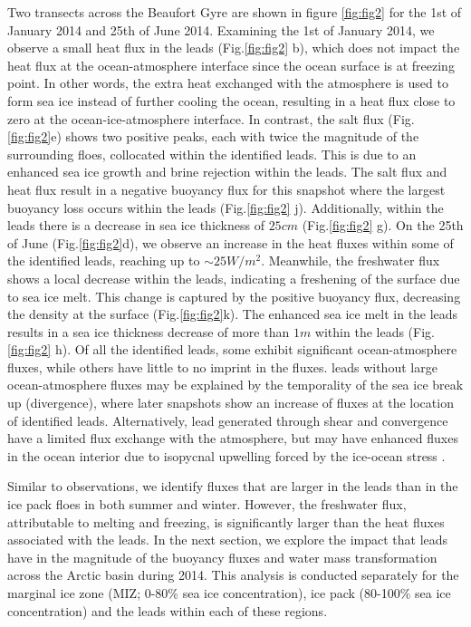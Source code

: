 \documentclass[draft]{agujournal2019}
\begin{document}
Two transects across the Beaufort Gyre are shown in figure \ref{fig:fig2} for the 1st of January 2014 and 25th of June 2014.
Examining the 1st of January 2014, we observe a small heat flux in the leads (Fig.\ref{fig:fig2} b), which does not impact the heat flux at the ocean-atmosphere interface since the ocean surface is at freezing point. 
In other words, the extra heat exchanged with the atmosphere is used to form sea ice instead of further cooling the ocean, resulting in a heat flux close to zero at the ocean-ice-atmosphere interface.
In contrast, the salt flux (Fig.\ref{fig:fig2}e) shows two positive peaks, each with twice the magnitude of the surrounding floes, collocated within the identified leads. This is due to an enhanced sea ice growth and brine rejection within the leads. 
The salt flux and heat flux result in a negative buoyancy flux for this snapshot where the largest buoyancy loss occurs within the leads (Fig.\ref{fig:fig2} j). Additionally, within the leads there is a decrease in sea ice thickness of $25cm$ (Fig.\ref{fig:fig2} g). 
On the 25th of June (Fig.\ref{fig:fig2}d), we observe an increase in the heat fluxes within some of the identified leads, reaching up to $\sim 25 W/m^2$. Meanwhile, the freshwater flux shows a local decrease within the leads, indicating a freshening of the surface due to sea ice melt. This change is captured by the positive buoyancy flux, decreasing the density at the surface (Fig.\ref{fig:fig2}k).  The enhanced sea ice melt in the leads results in a sea ice thickness decrease of more than $1m$ within the leads  (Fig.\ref{fig:fig2} h).
Of all the identified leads, some exhibit significant ocean-atmosphere fluxes, while others have little to no imprint in the fluxes. leads without large ocean-atmosphere fluxes may be explained by the temporality of the sea ice break up (divergence), where later snapshots show an increase of fluxes at the location of identified leads. Alternatively, lead generated through shear and convergence have a limited flux exchange with the atmosphere, but may have enhanced fluxes in the ocean interior due to isopycnal upwelling forced by the ice-ocean stress \citep{Bourgault_flux_lkf_2020}.

Similar to observations, we identify fluxes that are larger in the leads than in the ice pack floes in both summer and winter. However, the freshwater flux, attributable to melting and freezing, is significantly larger than the heat fluxes associated with the leads. In the next section, we explore the impact that leads have in the magnitude of the buoyancy fluxes and water mass transformation across the Arctic basin during 2014. This analysis is conducted separately for the marginal ice zone (MIZ; 0-80\% sea ice concentration), ice pack (80-100\% sea ice concentration) and the leads within each of these regions. 
\end{document}
